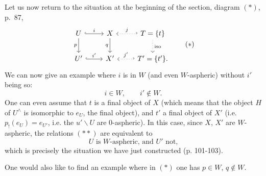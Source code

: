Let us now return to the situation at the beginning of the section, diagram $(*)$, p.~87,
\[
\begin{tikzcd}
U \arrow[r, hook, "i"] \arrow[d, "p"'] & X \arrow[d, "q"'] & T = \{t\} \arrow[l, hook', dotted, "j"'] \arrow[d, dotted, "\mathrm{iso}"] \\
U' \arrow[r, hook, "i'"] & X' & T' = \{t'\}. \arrow[l, hook', dotted, "j'"']
\end{tikzcd}
\tag*{$(*)$}
\]
We can now give an example where $i$ is in $W$ (and even $W$-aspheric) without $i'$ being so:
\[
i \in W, \qquad i' \notin W. \tag*{$(**)$}
\]
One can even assume that $t$ is a final object of $X$ (which means that the object $H$ of $U^\wedge$ is isomorphic to $e_U$, the final object), and $t'$ a final object of $X'$ (i.e. $p_!(e_U) = e_{U'}$, i.e. the $u'\backslash U$ are 0-aspheric). In this case, since $X$, $X'$ are $W$-aspheric, the relations $(**)$ are equivalent to
\[
U \text{ is } W\text{-aspheric, and } U' \text{ not,} \tag*{$(***)$}
\]
which is precisely the situation we have just constructed (p. 101-103).

One would also like to find an example where in $(*)$ one has $p \in W$, $q \notin W$.
